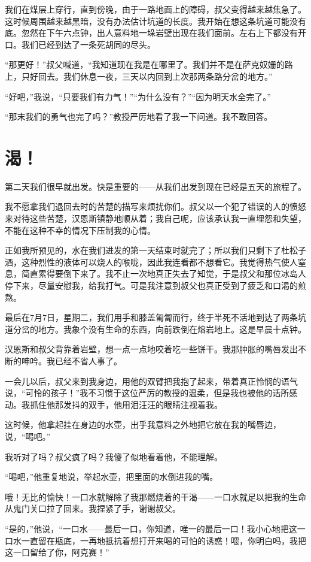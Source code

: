 \documentclass[10pt]{book}
\begin{document}
我们在煤层上穿行，直到傍晚，由于一路地面上的障碍，叔父变得越来越焦急了。这时候周围越来越黑暗，没有办法估计坑道的长度。我开始在想这条坑道可能没有底。忽然在下午六点钟，出人意料地一垛岩壁出现在我们面前。左右上下都没有开口。我们已经到达了一条死胡同的尽头。

“那更好！”叔父喊道，“我知道现在我是在哪里了。我们并不是在萨克奴姗的路上，只好回去。我们休息一夜，三天以内回到上次那两条路分岔的地方。”

“好吧，”我说，“只要我们有力气！”“为什么没有？”“因为明天水全完了。”

“那末我们的勇气也完了吗？”教授严厉地看了我一下问道。我不敢回答。
\chapter{渴！}
第二天我们很早就出发。快是重要的——从我们出发到现在已经是五天的旅程了。

我不愿拿我们退回去时的苦楚的描写来烦扰你们。叔父以一个犯了错误的人的愤怒来对待这些苦楚，汉恩斯镇静地顺从着；我自己呢，应该承认我一直埋怨和失望，不能在这种不幸的情况下压制我的心情。

正如我所预见的，水在我们进发的第一天结束时就完了；所以我们只剩下了杜松子酒，这种烈性的液体可以烧人的喉咙，因此我连看都不想看它。我觉得热气使人窒息，简直累得要倒下来了。我不止一次地真正失去了知觉，于是叔父和那位冰岛人停下来，尽量安慰我，给我打气。可是我注意到叔父也真正受到了疲乏和口渴的煎熬。

最后在7月7日，星期二，我们用手和膝盖匍匐而行，终于半死不活地到达了两条坑道分岔的地方。我象个没有生命的东西，向前跌倒在熔岩地上。这是早晨十点钟。

汉恩斯和叔父背靠着岩壁，想一点一点地咬着吃一些饼干。我那肿胀的嘴唇发出不断的呻吟。我已经不省人事了。

一会儿以后，叔父来到我身边，用他的双臂把我抱了起来，带着真正怜悯的语气说，“可怜的孩子！”我不习惯于这位严厉的教授的温柔，但是我也被他的话所感动。我抓住他那发抖的双手，他用泪汪汪的眼睛注视着我。

这时候，他拿起挂在身边的水壶，出乎我意料之外地把它放在我的嘴唇边，说，“喝吧。”

我听对了吗？叔父疯了吗？我傻了似地看着他，不能理解。

“喝吧，”他重复地说，举起水壶，把里面的水倒进我的嘴。

哦！无比的愉快！一口水就解除了我那燃烧着的干渴——一口水就足以把我的生命从鬼门关口拉了回来。我捏紧了手，谢谢叔父。

“是的，”他说，“一口水——最后一口，你知道，唯一的最后一口！我小心地把这一口水一直留在瓶底，一再地抵抗着想打开来喝的可怕的诱惑！喂，你明白吗，我把这一口留给了你，阿克赛！”
\end{document}
